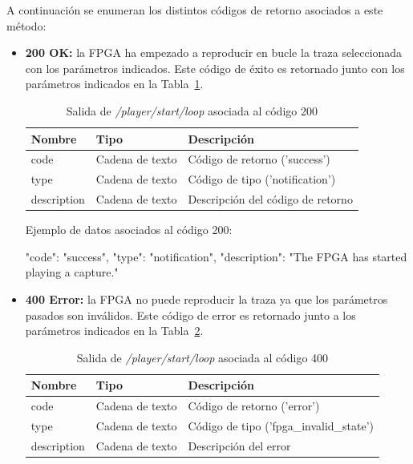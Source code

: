 A continuación se enumeran los distintos códigos de retorno asociados a este método:
\begin{itemize}

\item{\textbf{200 OK:} la \gls{FPGA} ha empezado a reproducir en bucle la \gls{traza} seleccionada con los parámetros indicados.
Este código de éxito es retornado junto con los parámetros indicados en la Tabla~\ref{extra:api:playerstartloop:ok}.
\begin{table}[H]
\centering
\begin{tabular}{|l|l|l|}
\hline
\rowcolor[HTML]{F5F5F5}
\textbf{Nombre}  & \textbf{Tipo}   & \textbf{Descripción}              \\ \hline
code             & Cadena de texto & Código de retorno ('success')     \\ \hline
type             & Cadena de texto & Código de tipo ('notification')   \\ \hline
description      & Cadena de texto & Descripción del código de retorno \\ \hline
\end{tabular}
\caption{Salida de \textit{/player/start/loop} asociada al código 200}
\label{extra:api:playerstartloop:ok}
\end{table}
\begin{minipage}{\textwidth}
Ejemplo de datos asociados al código 200:

\begin{code}[language=json]
{
  "code": "success",
  "type": "notification",
  "description": "The FPGA has started playing a capture."
}
\end{code}
\end{minipage}
}

\item{\textbf{400 Error:} la \gls{FPGA} no puede reproducir la \gls{traza} ya que los parámetros pasados son inválidos.
Este código de error es retornado junto a los parámetros indicados en la Tabla~\ref{extra:api:playerstartloop:error400}.
\begin{table}[H]
\centering
\begin{tabular}{|l|l|l|}
\hline
\rowcolor[HTML]{F5F5F5}
\textbf{Nombre}  & \textbf{Tipo}   & \textbf{Descripción}                    \\ \hline
code             & Cadena de texto & Código de retorno ('error')             \\ \hline
type             & Cadena de texto & Código de tipo ('fpga\_invalid\_state') \\ \hline
description      & Cadena de texto & Descripción del error                   \\ \hline
\end{tabular}
\caption{Salida de \textit{/player/start/loop} asociada al código 400}
\label{extra:api:playerstartloop:error400}
\end{table}

}
\end{itemize}
